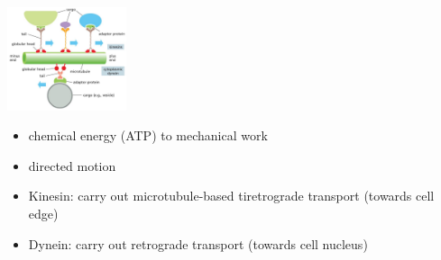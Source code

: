\begin{minipage}{0.41\linewidth}
    \includegraphics[width=35mm]{src/Images/intracellular.png}
\end{minipage}
\begin{minipage}{0.59\linewidth}
    \begin{itemize}
        \item chemical energy (ATP) to mechanical work
        \item directed motion
        \item Kinesin: carry out microtubule-based tiretrograde transport (towards cell edge)
        \item Dynein: carry out retrograde transport
(towards cell nucleus)
    \end{itemize}
\end{minipage}